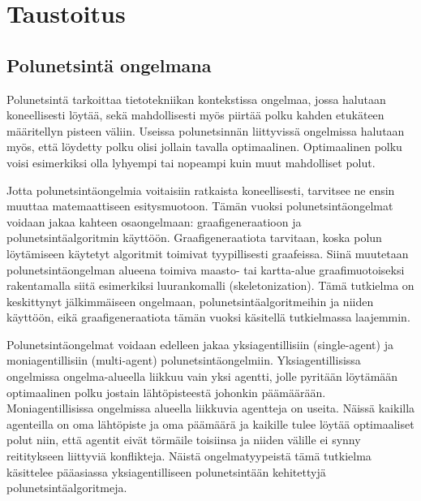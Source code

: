 \chapter{Taustoitus} \label{Taustoitus}

\section{Polunetsintä ongelmana}\label{pOngelmana}
Polunetsintä tarkoittaa tietotekniikan kontekstissa ongelmaa, jossa halutaan 
koneellisesti löytää, sekä mahdollisesti myös piirtää polku kahden 
etukäteen määritellyn pisteen väliin. Useissa polunetsinnän liittyvissä 
ongelmissa halutaan myös, että löydetty polku olisi jollain tavalla 
optimaalinen. Optimaalinen polku voisi esimerkiksi olla lyhyempi tai nopeampi 
kuin muut mahdolliset polut\cite{MathewAndMalathy}.\par
	Jotta polunetsintäongelmia voitaisiin ratkaista koneellisesti, 
tarvitsee ne ensin muuttaa matemaattiseen esitysmuotoon. Tämän vuoksi 
polunetsintäongelmat voidaan jakaa kahteen osaongelmaan: graafigeneraatioon 
ja polunetsintäalgoritmin käyttöön. Graafigeneraatiota tarvitaan, koska polun 
löytämiseen käytetyt algoritmit toimivat tyypillisesti graafeissa. Siinä 
muutetaan polunetsintäongelman alueena toimiva maasto- tai kartta-alue 
graafimuotoiseksi rakentamalla siitä esimerkiksi luurankomalli 
(skeletonization)\cite{ACMHindawi}. Tämä tutkielma on keskittynyt 
jälkimmäiseen ongelmaan, polunetsintäalgoritmeihin ja niiden käyttöön, eikä 
graafigeneraatiota tämän vuoksi käsitellä tutkielmassa laajemmin. \par
	Polunetsintäongelmat voidaan edelleen jakaa yksiagentillisiin 
(single-agent) ja moniagentillisiin (multi-agent) polunetsintäongelmiin. 
Yksiagentillisissa ongelmissa ongelma-alueella liikkuu vain yksi agentti, 
jolle pyritään löytämään optimaalinen polku jostain lähtöpisteestä johonkin 
päämäärään. Moniagentillisissa ongelmissa alueella liikkuvia agentteja on 
useita. Näissä kaikilla agenteilla on oma lähtöpiste ja oma päämäärä ja 
kaikille tulee löytää optimaaliset polut niin, että agentit eivät törmäile 
toisiinsa ja niiden välille ei synny reititykseen liittyviä 
konflikteja\cite{arXivMAPF}. Näistä ongelmatyypeistä tämä tutkielma käsittelee 
pääasiassa yksiagentilliseen polunetsintään kehitettyjä 
polunetsintäalgoritmeja.

